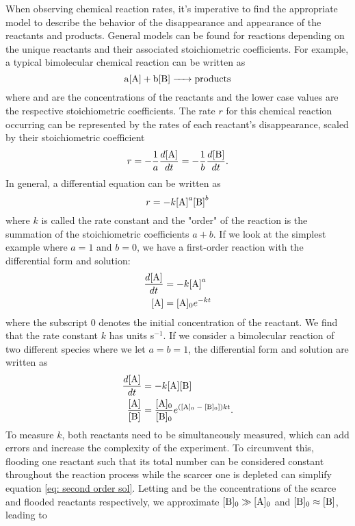 When observing chemical reaction rates, it's imperative to find the appropriate model to describe the behavior of the disappearance and appearance of the reactants and products. General models can be found for reactions depending on the unique reactants and their associated stoichiometric coefficients. For example, a typical bimolecular chemical reaction can be written as
\begin{equation}
	\ce{a[A] + b[B] -> products}
	\label{eq: general reaction}
\end{equation}
where \ce{[A]} and \ce{[B]} are the concentrations of the reactants and the lower case values are the respective stoichiometric coefficients. The rate $r$ for this chemical reaction occurring can be represented by the rates of each reactant's disappearance, scaled by their stoichiometric coefficient
\begin{equation}
	r = -\frac{1}{a}\frac{d\ce{[A]}}{dt} = -\frac{1}{b}\frac{d\ce{[B]}}{dt}.
\end{equation}
In general, a differential equation can be written as
\begin{equation}
	r = -k\ce{[A]}^a\ce{[B]}^b
	\label{eq: diff rate form}
\end{equation}
where $k$ is called the rate constant and the "order" of the reaction is the summation of the stoichiometric coefficients $a+b$. If we look at the simplest example where $a=1$ and $b=0$, we have a first-order reaction with the differential form and solution:
\begin{align}
	\frac{d \ce{[A]}}{dt} & = -k\ce{[A]}^a \nonumber \\
	\ce{[A]} & = \ce{[A]0}e^{-kt} \label{eq: first order sol}
\end{align}
where the subscript $0$ denotes the initial concentration of the reactant. We find that the rate constant $k$ has units s$^{-1}$. If we consider a bimolecular reaction of two different species where we let $a=b=1$, the differential form and solution are written as
\begin{align}
	\frac{d \ce{[A]}}{dt} & = -k \ce{[A]}\ce{[B]} \nonumber \\
	\frac{\ce{[A]}}{\ce{[B]}} & = \frac{\ce{[A]0}}{\ce{[B]0}}e^{(\ce{[A]0 - [B]0}])kt}. \label{eq: second order sol}
\end{align}
To measure $k$, both reactants need to be simultaneously measured, which can add errors and increase the complexity of the experiment. To circumvent this, flooding one reactant such that its total number can be considered constant throughout the reaction process while the scarcer one is depleted can simplify equation \ref{eq: second order sol}. Letting \ce{[A]} and \ce{[B]} be the concentrations of the scarce and flooded reactants respectively, we approximate $\ce{[B]0} \gg \ce{[A]0}$ and $\ce{[B]0} \approx \ce{[B]}$, leading to
